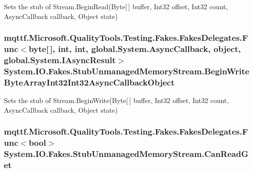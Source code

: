 Sets the stub of Stream.\-Begin\-Read(\-Byte\mbox{[}$\,$\mbox{]} buffer, Int32 offset, Int32 count, Async\-Callback callback, Object state)

\hypertarget{class_system_1_1_i_o_1_1_fakes_1_1_stub_unmanaged_memory_stream_a290c4539fed1022f8c86270e72996091}{
\subsubsection[{Begin\-Write\-Byte\-Array\-Int32\-Int32\-Async\-Callback\-Object}]{\setlength{\rightskip}{0pt plus 5cm}mqttf.\-Microsoft.\-Quality\-Tools.\-Testing.\-Fakes.\-Fakes\-Delegates.\-Func$<$byte\mbox{[}$\,$\mbox{]}, int, int, global.\-System.\-Async\-Callback, object, global.\-System.\-I\-Async\-Result$>$ System.\-I\-O.\-Fakes.\-Stub\-Unmanaged\-Memory\-Stream.\-Begin\-Write\-Byte\-Array\-Int32\-Int32\-Async\-Callback\-Object}}\label{class_system_1_1_i_o_1_1_fakes_1_1_stub_unmanaged_memory_stream_a290c4539fed1022f8c86270e72996091}


Sets the stub of Stream.\-Begin\-Write(\-Byte\mbox{[}$\,$\mbox{]} buffer, Int32 offset, Int32 count, Async\-Callback callback, Object state)

\hypertarget{class_system_1_1_i_o_1_1_fakes_1_1_stub_unmanaged_memory_stream_ad161499583178078d28d036b4da8215b}{
\subsubsection[{Can\-Read\-Get}]{\setlength{\rightskip}{0pt plus 5cm}mqttf.\-Microsoft.\-Quality\-Tools.\-Testing.\-Fakes.\-Fakes\-Delegates.\-Func$<$bool$>$ System.\-I\-O.\-Fakes.\-Stub\-Unmanaged\-Memory\-Stream.\-Can\-Read\-Get}}\label{class_system_1_1_i_o_1_1_fakes_1_1_stub_unmanaged_memory_stream_ad161499583178078d28d036b4da8215b}


